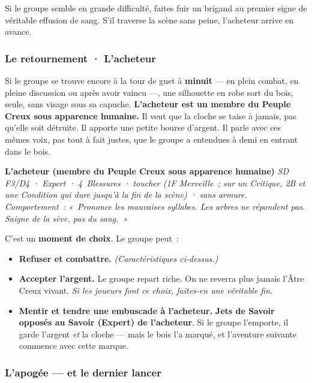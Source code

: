 \documentclass[10pt,a4paper]{article}
\newcommand{\tightlist}{\setlength{\itemsep}{0pt}\setlength{\parskip}{0pt}}
\begin{document}
Si le groupe semble en grande difficulté, faites fuir un brigand au premier signe de véritable effusion de sang. S’il traverse la scène sans peine, l’acheteur arrive en avance.

\subsubsection{Le retournement · L’acheteur}\label{le-retournement-lacheteur}

Si le groupe se trouve encore à la tour de guet à \textbf{minuit} --- en plein combat, en pleine discussion ou après avoir vaincu ---, une silhouette en robe sort du bois, seule, sans visage sous sa capuche. \textbf{L’acheteur est un membre du Peuple Creux sous apparence humaine.} Il veut que la cloche se taise à jamais, pas qu’elle soit détruite. Il apporte une petite bourse d’argent. Il parle avec ces mêmes voix, pas tout à fait justes, que le groupe a entendues à demi en entrant dans le bois.

\par\smallskip\begin{rpgnote}[fontupper=\normalfont]\textbf{L’acheteur (membre du Peuple Creux sous apparence humaine)} \emph{SD F3/D4 · Expert · 4~Blessures · toucher (1F Merveille~; sur un Critique, 2B et une Condition qui dure jusqu’à la fin de la scène) · sans armure.} \emph{Comportement~: «~Prononce les mauvaises syllabes. Les arbres ne répondent pas. Saigne de la sève, pas du sang.~»}\end{rpgnote}\par\smallskip
C’est un \textbf{moment de choix}. Le groupe peut~:

\begin{itemize}
\tightlist
\item
  \textbf{Refuser et combattre.} \emph{(Caractéristiques ci-dessus.)}
\item
  \textbf{Accepter l’argent.} Le groupe repart riche. On ne reverra plus jamais l’Âtre Creux vivant. \emph{Si les joueurs font ce choix, faites-en une véritable fin.}
\item
  \textbf{Mentir et tendre une embuscade à l’acheteur.} \textbf{Jets de Savoir opposés au Savoir (Expert) de l’acheteur}. Si le groupe l’emporte, il garde l’argent \emph{et} la cloche --- mais le bois l’a marqué, et l’aventure suivante commence avec cette marque.
\end{itemize}

\subsubsection{L’apogée --- et le dernier lancer}\label{lapoguxe9e-le-dernier-lancer}
\end{document}
